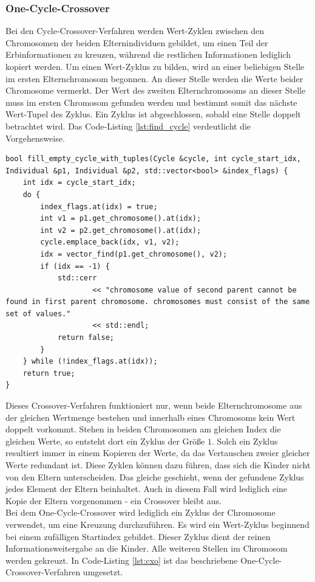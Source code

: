 \subsubsection{One-Cycle-Crossover}
Bei den Cycle-Crossover-Verfahren \cite[S. 275]{schoeneburg} werden Wert-Zyklen zwischen den Chromosomen der beiden Elternindividuen gebildet, um einen Teil der Erbinformationen zu kreuzen, während die restlichen Informationen lediglich kopiert werden.
Um einen Wert-Zyklus zu bilden, wird an einer beliebigen Stelle im ersten Elternchromosom begonnen. An dieser Stelle werden die Werte beider Chromosome vermerkt. Der Wert des zweiten Elternchromosoms an dieser Stelle muss im ersten Chromosom gefunden werden und bestimmt somit das nächste Wert-Tupel des Zyklus. Ein Zyklus ist abgeschlossen, sobald eine Stelle doppelt betrachtet wird. Das Code-Listing \ref{lst:find_cycle} verdeutlicht die Vorgehensweise.

\begin{minipage}{\linewidth}
\begin{lstlisting}[caption={Zyklus finden}, firstnumber=1, captionpos=b, label=lst:find_cycle]
bool fill_empty_cycle_with_tuples(Cycle &cycle, int cycle_start_idx, Individual &p1, Individual &p2, std::vector<bool> &index_flags) {
    int idx = cycle_start_idx;
    do {
        index_flags.at(idx) = true;
        int v1 = p1.get_chromosome().at(idx);
        int v2 = p2.get_chromosome().at(idx);
        cycle.emplace_back(idx, v1, v2);
        idx = vector_find(p1.get_chromosome(), v2);
        if (idx == -1) {
            std::cerr
                    << "chromosome value of second parent cannot be found in first parent chromosome. chromosomes must consist of the same set of values."
                    << std::endl;
            return false;
        }
    } while (!index_flags.at(idx));
    return true;
}
\end{lstlisting}
\end{minipage}

Dieses Crossover-Verfahren funktioniert nur, wenn beide Elternchromosome aus der gleichen Wertmenge bestehen und innerhalb eines Chromosoms kein Wert doppelt vorkommt.
Stehen in beiden Chromosomen am gleichen Index die gleichen Werte, so entsteht dort ein Zyklus der Größe $1$. Solch ein Zyklus resultiert immer in einem Kopieren der Werte, da das Vertauschen zweier gleicher Werte redundant ist. Diese Zyklen können dazu führen, dass sich die Kinder nicht von den Eltern unterscheiden.
Das gleiche geschieht, wenn der gefundene Zyklus jedes Element der Eltern beinhaltet. Auch in diesem Fall wird lediglich eine Kopie der Eltern vorgenommen - ein Crossover bleibt aus.\\
Bei dem One-Cycle-Crossover wird lediglich ein Zyklus der Chromosome verwendet, um eine Kreuzung durchzuführen. Es wird ein Wert-Zyklus beginnend bei einem zufälligen Startindex gebildet. Dieser Zyklus dient der reinen Informationsweitergabe an die Kinder. Alle weiteren Stellen im Chromosom werden gekreuzt.
In Code-Listing \ref{lst:cxo} ist das beschriebene One-Cycle-Crossover-Verfahren umgesetzt.

